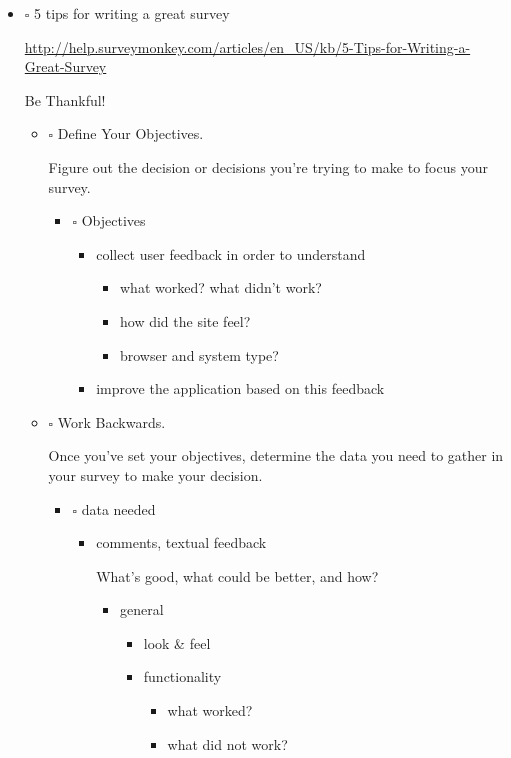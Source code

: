 \documentclass[11pt]{article}
\begin{document}
\begin{itemize}
\begin{itemize}
\begin{itemize}
\begin{itemize}
\begin{itemize}
\item $\square$ 5 tips for writing a great survey

\url{http://help.surveymonkey.com/articles/en_US/kb/5-Tips-for-Writing-a-Great-Survey}

Be Thankful!

\begin{itemize}
\item $\square$ Define Your Objectives. 

Figure out the decision or decisions you're trying to make to 
focus your survey.   

\begin{itemize}
\item $\square$ Objectives

\begin{itemize}
\item collect user feedback in order to understand

\begin{itemize}
\item what worked? what didn't work?
\item how did the site feel?
\item browser and system type?
\end{itemize}

\item improve the application based on this feedback
\end{itemize}
\end{itemize}

\item $\square$ Work Backwards. 

Once you've set your objectives, determine the data you need to 
gather in your survey to make your decision.

\begin{itemize}
\item $\square$ data needed

\begin{itemize}
\item comments, textual feedback

What's good, what could be better, and how?

\begin{itemize}
\item general
\begin{itemize}
\item look \& feel
\item functionality
\begin{itemize}
\item what worked?
\item what did not work?
\end{itemize}
\end{itemize}
\end{itemize}
\end{itemize}
\end{itemize}


\end{itemize}
\end{itemize}
\end{itemize}
\end{itemize}
\end{itemize}
\end{itemize}
\end{document}
